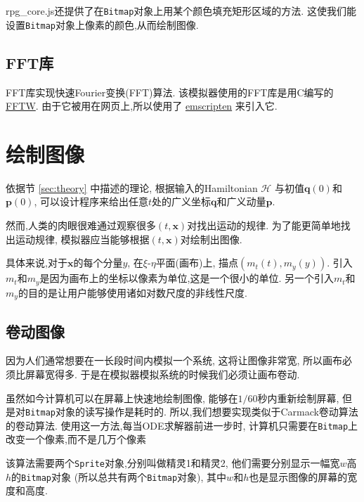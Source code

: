 \documentclass[12pt]{article}
\begin{document}
rpg\_core.js还提供了在\texttt{Bitmap}对象上用某个颜色填充矩形区域的方法.
这使我们能设置\texttt{Bitmap}对象上像素的颜色,从而绘制图像.

\subsection{FFT库}
\label{sec:fft}

FFT库实现快速Fourier变换(FFT)算法.
该模拟器使用的FFT库是用C编写的 \href{http://www.fftw.org}{FFTW}.
由于它被用在网页上,所以使用了 \href{https://emscripten.org}{emscripten} 来引入它.

\section{绘制图像}

依据节 \ref{sec:theory} 中描述的理论,
根据输入的Hamiltonian $\mathcal H$
与初值$\mathbf q\left(0\right)$和$\mathbf p\left(0\right)$,
可以设计程序来给出任意$t$处的广义坐标$\mathbf q$和广义动量$\mathbf p$.

然而,人类的肉眼很难通过观察很多$\left(t,\mathbf x\right)$对找出运动的规律.
为了能更简单地找出运动规律,
模拟器应当能够根据$\left(t,\mathbf x\right)$对绘制出图像.

具体来说,对于$\mathbf x$的每个分量$y$,
在$\xi$-$\eta$平面(画布)上,
描点$\left(m_t\left(t\right),m_y\left(y\right)\right)$.
引入$m_t$和$m_y$是因为画布上的坐标以像素为单位,这是一个很小的单位.
另一个引入$m_t$和$m_y$的目的是让用户能够使用诸如对数尺度的非线性尺度.

\subsection{卷动图像}

因为人们通常想要在一长段时间内模拟一个系统,
这将让图像非常宽,
所以画布必须比屏幕宽得多.
于是在模拟器模拟系统的时候我们必须让画布卷动.

虽然如今计算机可以在屏幕上快速地绘制图像,
能够在$1/60$秒内重新绘制屏幕,
但是对\texttt{Bitmap}对象的读写操作是耗时的.
所以,我们想要实现类似于Carmack卷动算法的卷动算法.
使用这一方法,每当ODE求解器前进一步时,
计算机只需要在\texttt{Bitmap}上改变一个像素,而不是几万个像素

该算法需要两个\texttt{Sprite}对象,分别叫做精灵1和精灵2,
他们需要分别显示一幅宽$w$高$h$的\texttt{Bitmap}对象
(所以总共有两个\texttt{Bitmap}对象),
其中$w$和$h$也是显示图像的屏幕的宽度和高度.
\end{document}
